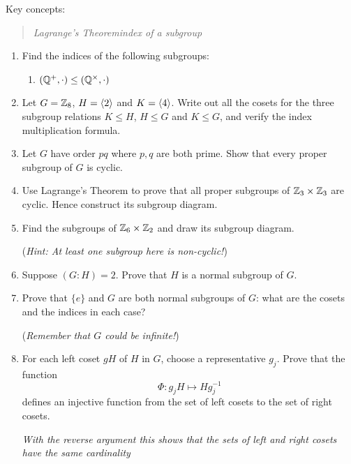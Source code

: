\begin{exercises}
Key concepts:
\begin{quote}
	\emph{Lagrange's Theorem\qquad index of a subgroup}
\end{quote}

\begin{enumerate}
  	\item Find the indices of the following subgroups:
		\begin{enumerate}
  		\item {}$(\mathbb{Q}^+,\cdot)\le(\mathbb{Q}^\times,\cdot)$
		\end{enumerate}
		
		
		
		
	\item Let $G=\mathbb{Z}_8$, $H=\left\langle 2\right\rangle$ and $K=\left\langle 4\right\rangle$. Write out all the cosets for the three subgroup relations $K\le H$, $H\le G$ and $K\le G$, and verify the index multiplication formula.
  
  
	\item Let $G$ have order $pq$ where $p,q$ are both prime. Show that every proper subgroup of $G$ is cyclic.
	
	
	\item Use Lagrange's Theorem to prove that all proper subgroups of $\mathbb{Z}_3\times\mathbb{Z}_3$ are cyclic. Hence construct its subgroup diagram.
	
	
	\item Find the subgroups of $\mathbb{Z}_6\times\mathbb{Z}_2$ and draw its subgroup diagram.\par
	(\emph{Hint: At least one subgroup here is \emph{non-cyclic}!})
	
	
	\item Suppose $(G:H)=2$. Prove that $H$ is a normal subgroup of $G$.
	
  
  \item Prove that $\{e\}$ and $G$ are both normal subgroups of $G$: what are the cosets and the indices in each case?\par
  (\emph{Remember that $G$ could be infinite!})
  
  
  \item\label{exs:indexcard} For each left coset $gH$ of $H$ in $G$, choose a representative $g_j$. Prove that the function
  \[\Phi:g_jH\mapsto Hg_j^{-1}\]
  defines an injective function from the set of left cosets to the set of right cosets.\par
  \emph{With the reverse argument this shows that the sets of left and right cosets have the same cardinality}
	

\end{enumerate}
\end{exercises}
